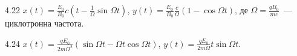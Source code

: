 \begin{Solution}{4.{22}}
	$x(t)  = \frac{E_0}{B_0}c\left( t - \frac{1}{\Omega}\sin\Omega t \right) $,
	$y(t)  = \frac{E_0}{B_0} \frac{c}{\Omega}\left( 1 - \cos\Omega t \right) $, де $\Omega = \frac{qB_0}{mc}$~--- циклотронна частота.
\end{Solution}
\begin{Solution}{4.{24}}
	$x(t)  = \frac{qE_0}{2m\Omega^2}\left( \sin\Omega t - \Omega t\cos\Omega t \right) $,
	$y(t)  = \frac{qE_0}{2m\Omega}t\sin\Omega t$.
\end{Solution}
